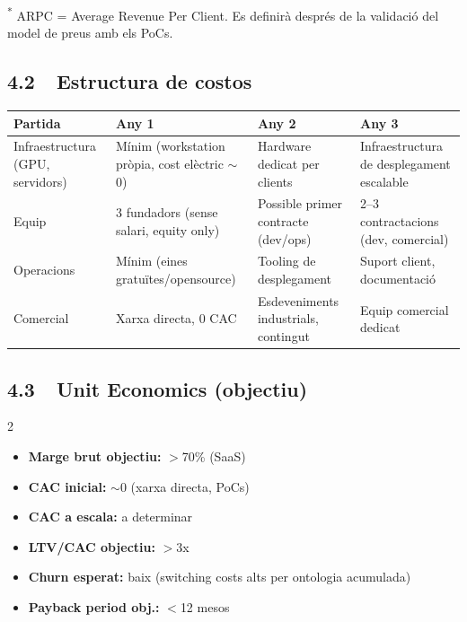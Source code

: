 \documentclass[11pt,a4paper]{article}
\begin{document}
\small\textsuperscript{*} ARPC = Average Revenue Per Client. Es definirà després de la validació del model de preus amb els PoCs.

\normalsize
\subsection{4.2~~Estructura de costos}

\begin{center}
\renewcommand{\arraystretch}{1.3}
\begin{tabularx}{0.92\textwidth}{l X X X}
\toprule
\textbf{Partida} & \textbf{Any 1} & \textbf{Any 2} & \textbf{Any 3} \\
\midrule
Infraestructura (GPU, servidors) & Mínim (workstation pròpia, cost elèctric $\sim$0) & Hardware dedicat per clients & Infraestructura de desplegament escalable \\
Equip & 3 fundadors (sense salari, equity only) & Possible primer contracte (dev/ops) & 2--3 contractacions (dev, comercial) \\
Operacions & Mínim (eines gratuïtes/opensource) & Tooling de desplegament & Suport client, documentació \\
Comercial & Xarxa directa, 0 CAC & Esdeveniments industrials, contingut & Equip comercial dedicat \\
\bottomrule
\end{tabularx}
\end{center}

\subsection{4.3~~Unit Economics (objectiu)}

\begin{multicols}{2}
\begin{itemize}[leftmargin=1.2em,itemsep=2pt]
\item \textbf{Marge brut objectiu:} $>$70\% (SaaS)
\item \textbf{CAC inicial:} $\sim$0 (xarxa directa, PoCs)
\item \textbf{CAC a escala:} a determinar
\end{itemize}
\columnbreak
\begin{itemize}[leftmargin=1.2em,itemsep=2pt]
\item \textbf{LTV/CAC objectiu:} $>$3x
\item \textbf{Churn esperat:} baix (switching costs alts per ontologia acumulada)
\item \textbf{Payback period obj.:} $<$12 mesos
\end{itemize}
\end{multicols}
\end{document}
